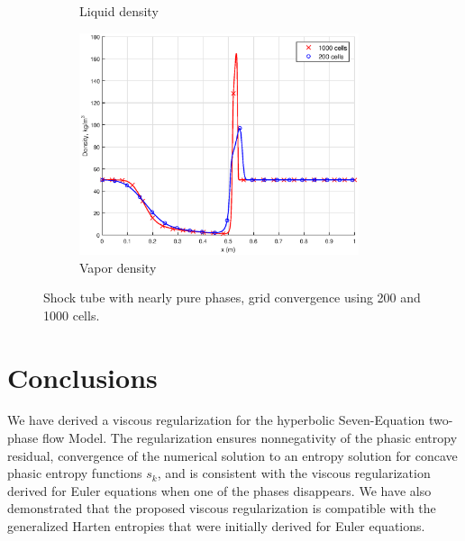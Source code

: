 \begin{figure}[H]
\begin{subfigure}[b]{0.45\textwidth}
                \caption{Liquid density\\ \phantom{A}}
                \label{fig:nearly_pure_density_liq_compare}
        \end{subfigure}
        \begin{subfigure}[b]{0.45\textwidth}
                \centering
                \includegraphics[width=0.9\textwidth]{figures/Nearly_pure_density_vap_compare.eps}
                \caption{Vapor density}
                \label{fig:nearly_pure_density_vap_compare}
        \end{subfigure}
        \caption{Shock tube with nearly pure phases, grid convergence using 200 and 1000 cells.}\label{fig:nearly_pure_compare}
\end{figure}

\section{Conclusions}\label{sec:conclusion}
%
We have derived a viscous regularization for the hyperbolic Seven-Equation two-phase flow Model. 
The regularization ensures nonnegativity of the phasic entropy residual, 
convergence of the numerical solution to an entropy solution for concave phasic entropy functions $s_k$,
and is consistent with the viscous regularization derived for Euler equations when one of the phases disappears. 
We have also demonstrated that the proposed viscous regularization is compatible with the generalized Harten entropies 
that were initially derived for Euler equations. 

